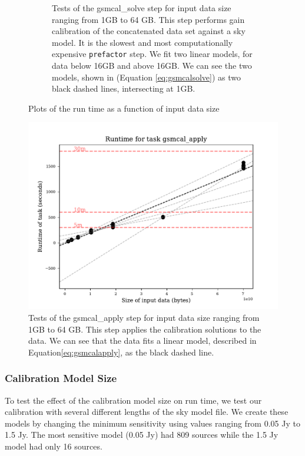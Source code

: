 \begin{figure}[t!]
\begin{subfigure}[b]{0.44\textwidth}
            \caption[]%
            {{\small Tests of the {\selectfont gsmcal\_solve} step for input data size ranging from 1GB to 64 GB. This step performs gain calibration of the concatenated data set against a sky model. It is the slowest and most computationally expensive \texttt{prefactor} step. We fit two linear models, for data below 16GB and above 16GB. We can see the two models, shown in  (Equation \ref{eq:gsmcalsolve}) as two black dashed lines, intersecting at 1GB.}}    
            \label{fig:gsmcalsolve_size}
        \end{subfigure}
        \caption[ ]
        {\small Plots of the run time as a function of input data size} 
\end{figure}


\begin{figure}
\includegraphics[width=0.95\linewidth]{figures/gsmcal_apply_size.pdf}
        \caption{\small Tests of the {\selectfont gsmcal\_apply} step for input data size ranging from 1GB to 64 GB. This step applies the calibration solutions to the data. We can see that the data fits a linear model, described in Equation\ref{eq:gsmcalapply}, as the black dashed line.}
            \label{fig:gsmcalapply_size}
\end{figure}

\subsubsection{Calibration Model Size}
To test the effect of the calibration model size on run time, we test our calibration with several different lengths of the sky model file. We create these models by changing the minimum sensitivity using values ranging from 0.05 Jy to 1.5 Jy. The most sensitive model (0.05 Jy) had 809 sources while the 1.5 Jy model had only 16 sources. 

